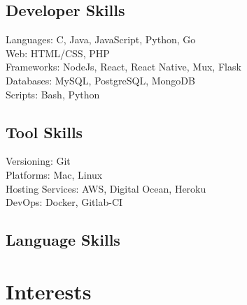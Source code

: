 \documentclass[a4paper]{deedy-resume} %
\begin{document}
\begin{minipage}[t]{0.49\textwidth}

\subsection{Developer Skills}

\textbullet{} Languages: C, Java, JavaScript, Python, Go \\
\textbullet{} Web: HTML/CSS, PHP \\
\textbullet{} Frameworks: NodeJs, React, React Native, Mux, Flask \\
\textbullet{} Databases: MySQL, PostgreSQL, MongoDB  \\
\textbullet{} Scripts: Bash, Python\\

\end{minipage}
\begin{minipage}[t]{0.49\textwidth}

\subsection{Tool Skills}

\textbullet{} Versioning: Git \\
\textbullet{} Platforms: Mac, Linux \\
\textbullet{} Hosting Services: AWS, Digital Ocean, Heroku \\
\textbullet{} DevOps: Docker, Gitlab-CI \\

\end{minipage}
\begin{minipage}[t]{0.29\textwidth}

\insectionspace 

\subsection{Language Skills}


\end{minipage}

\sectionspace %
\sectionspace %



\section{Interests}
\end{document}
